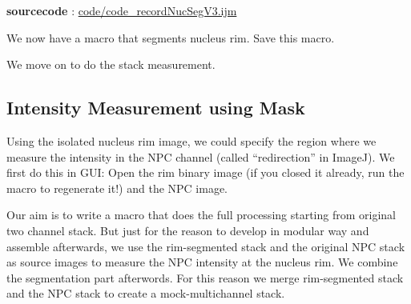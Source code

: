 \textbf{sourcecode} : \href{http://www.example.com/contents}{code/code\_recordNucSegV3.ijm}

We now have a macro that segments nucleus rim. Save this macro.

We move on to do the stack measurement.

\subsection{Intensity Measurement using Mask}

Using the isolated nucleus rim image, we could specify the region where we measure the intensity in the NPC channel (called ``redirection'' in ImageJ). We first do this in GUI: Open the rim binary image (if you closed it already, run the macro to regenerate it!) and the NPC image.

Our aim is to write a macro that does the full processing starting from original two channel stack. But just for the reason to develop in modular way and assemble afterwards, we use the rim-segmented stack and the original NPC stack as source images to measure the NPC intensity at the nucleus rim. We combine the segmentation part afterwords. For this reason we merge rim-segmented stack and the NPC stack to create a mock-multichannel stack.